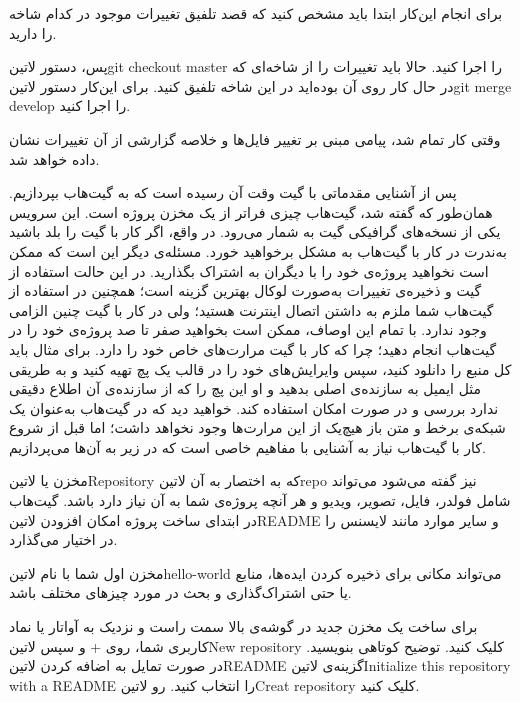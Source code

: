 برای انجام این‌کار ابتدا باید مشخص کنید که قصد تلفیق تغییرات موجود در کدام شاخه را دارید.

پس، دستور ‌لاتین{git checkout master} را اجرا کنید. حالا باید تغییرات را از شاخه‌ای که در حال کار روی آن بوده‌اید در این شاخه تلفیق کنید. برای این‌کار دستور ‌لاتین{git merge develop} را اجرا کنید.

وقتی کار تمام شد، پیامی مبنی بر تغییر فایل‌ها و خلاصه گزارشی از آن تغییرات نشان داده خواهد شد.


پس از آشنایی مقدماتی با گیت وقت آن رسیده است که به گیت‌هاب بپردازیم. همان‌طور که گفته شد، گیت‌هاب چیزی فراتر از یک مخزن پروژه است. این سرویس یکی از نسخه‌های گرافیکی گیت به شمار می‌رود. در واقع، اگر کار با گیت را بلد باشید به‌ندرت در کار با گیت‌هاب به مشکل برخواهید خورد. مسئله‌ی دیگر این است که ممکن است نخواهید پروژه‌ی خود را با دیگران به اشتراک بگذارید. در این حالت استفاده از گیت و ذخیره‌ی تغییرات به‌صورت لوکال بهترین گزینه است؛ همچنین در استفاده از گیت‌هاب شما ملزم به داشتن اتصال اینترنت هستید؛ ولی در کار با گیت چنین الزامی وجود ندارد. با تمام این اوصاف، ممکن است بخواهید صفر تا صد پروژه‌ی خود را در گیت‌هاب انجام دهید؛ چرا که کار با گیت مرارت‌های خاص خود را دارد. برای مثال باید کل منبع را دانلود کنید، سپس وایرایش‌های خود را در قالب یک پچ تهیه کنید و به طریقی مثل ایمیل به سازنده‌ی اصلی بدهید و او این پچ را که از سازنده‌ی آن اطلاع دقیقی ندارد بررسی و در صورت امکان استفاده کند. خواهید دید که در گیت‌هاب به‌عنوان یک شبکه‌ی برخط و متن‌ باز هیچ‌یک از این مرارت‌ها وجود نخواهد داشت؛ اما قبل از شروع کار با گیت‌هاب نیاز به آشنایی با مفاهیم خاصی است که در زیر به آن‌ها می‌پردازیم.

مخزن یا ‌لاتین{Repository} که به اختصار به آن ‌لاتین{repo} نیز گفته می‌شود می‌تواند شامل فولدر، فایل، تصویر، ویدیو و هر آنچه پروژه‌ی شما به آن نیاز دارد باشد. گیت‌هاب در ابتدای ساخت پروژه امکان افزودن ‌لاتین{README} و سایر موارد مانند لایسنس را در اختیار می‌گذارد.

مخزن اول شما با نام ‌لاتین{hello-world} می‌تواند مکانی برای ذخیره کردن ایده‌ها، منابع یا حتی اشتراک‌گذاری و بحث در مورد چیزهای مختلف باشد.

برای ساخت یک مخزن جدید در گوشه‌ی بالا سمت راست و نزدیک به آواتار یا نماد کاربری شما، روی + و سپس ‌لاتین{New repository} کلیک کنید.
توضیح کوتاهی بنویسید.
در صورت تمایل به اضافه کردن ‌لاتین{README} گزینه‌ی ‌لاتین{Initialize this repository with a README} را انتخاب کنید.
رو ‌لاتین{Creat repository } کلیک کنید.

